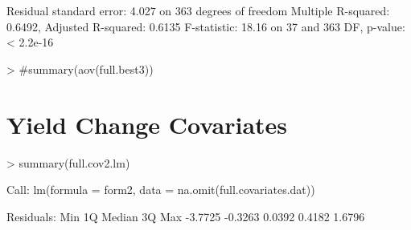 \documentclass{report}
\begin{document}
\begin{Schunk}
\begin{Soutput}
Residual standard error: 4.027 on 363 degrees of freedom
Multiple R-squared:  0.6492,	Adjusted R-squared:  0.6135 
F-statistic: 18.16 on 37 and 363 DF,  p-value: < 2.2e-16
\end{Soutput}
\begin{Sinput}
> #summary(aov(full.best3))
\end{Sinput}
\end{Schunk}

\section{Yield Change Covariates}
\begin{Schunk}
\begin{Sinput}
> summary(full.cov2.lm)
\end{Sinput}
\begin{Soutput}
Call:
lm(formula = form2, data = na.omit(full.covariates.dat))

Residuals:
    Min      1Q  Median      3Q     Max 
-3.7725 -0.3263  0.0392  0.4182  1.6796 


\end{Soutput}
\end{Schunk}
\end{document}

